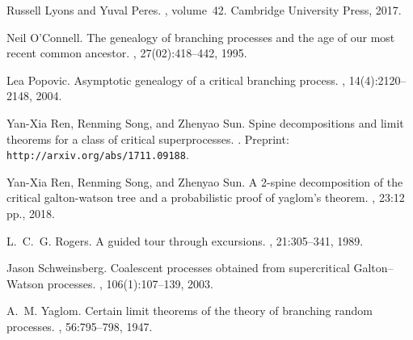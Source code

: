 \documentclass{article}
\theoremstyle{plain}
\theoremstyle{definition}
\begin{document}
\begin{thebibliography}{10}
Russell Lyons and Yuval Peres.
, volume~42.
\newblock Cambridge University Press, 2017.

Neil O'Connell.
\newblock The genealogy of branching processes and the age of our most recent
  common ancestor.
, 27(02):418--442, 1995.

Lea Popovic.
\newblock Asymptotic genealogy of a critical branching process.
, 14(4):2120--2148, 2004.

Yan-Xia Ren, Renming Song, and Zhenyao Sun.
\newblock Spine decompositions and limit theorems for a class of critical
  superprocesses.
.
\newblock Preprint: \texttt{http://arxiv.org/abs/1711.09188}.

Yan-Xia Ren, Renming Song, and Zhenyao Sun.
\newblock A 2-spine decomposition of the critical galton-watson tree and a
  probabilistic proof of yaglom's theorem.
, 23:12 pp., 2018.

L.~C.~G. Rogers.
\newblock A guided tour through excursions.
, 21:305--341, 1989.

Jason Schweinsberg.
\newblock Coalescent processes obtained from supercritical {G}alton--{W}atson
  processes.
, 106(1):107--139,
  2003.

A.~M. Yaglom.
\newblock Certain limit theorems of the theory of branching random processes.
, 56:795--798, 1947.

\end{thebibliography}
\end{document}

